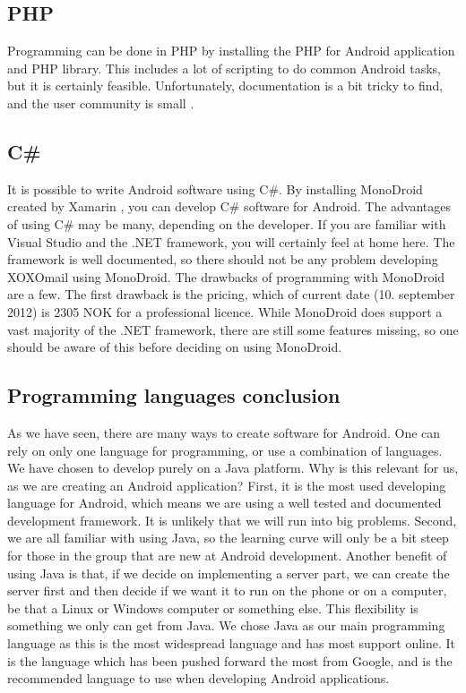 \subsection{PHP}
Programming can be done in PHP by installing the PHP for Android application and PHP library. This includes a lot of scripting to do common Android tasks, but it is certainly feasible. Unfortunately, documentation is a bit tricky to find, and the user community is small \cite{bib:php}.

\subsection{C\#}
It is possible to write Android software using C\#. By installing MonoDroid created by Xamarin \cite{bib:mbx}, you can develop C\# software for Android. The advantages of using C\# may be many, depending on the developer. If you are familiar with Visual Studio and the .NET framework, you will certainly feel at home here. The framework is well documented, so there should not be any problem developing XOXOmail using MonoDroid.
\newline
\newline
The drawbacks of programming with MonoDroid are a few. The first drawback is the pricing, which of current date (10. september 2012) is 2305 NOK for a professional licence. While MonoDroid does support a vast majority of the .NET framework, there are still some features missing, so one should be aware of this before deciding on using MonoDroid.

\subsection{Programming languages conclusion}
As we have seen, there are many ways to create software for Android. One can rely on only one language for programming, or use a combination of languages. We have chosen to develop purely on a Java platform. Why is this relevant for us, as we are creating an Android application?
\newline
\newline
First, it is the most used developing language for Android, which means we are using a well tested and documented development framework. It is unlikely that we will run into big problems. Second, we are all familiar with using Java, so the learning curve will only be a bit steep for those in the group that are new at Android development.  Another benefit of using Java is that, if we decide on implementing a server part, we can create the server first and then decide if we want it to run on the phone or on a computer, be that a Linux or Windows computer or something else. This flexibility is something we only can get from Java.
\newline
\newline
We chose Java as our main programming language as this is the most widespread language and has most support online. It is the language which has been pushed forward the most from Google, and is the recommended language to use when developing Android applications.





